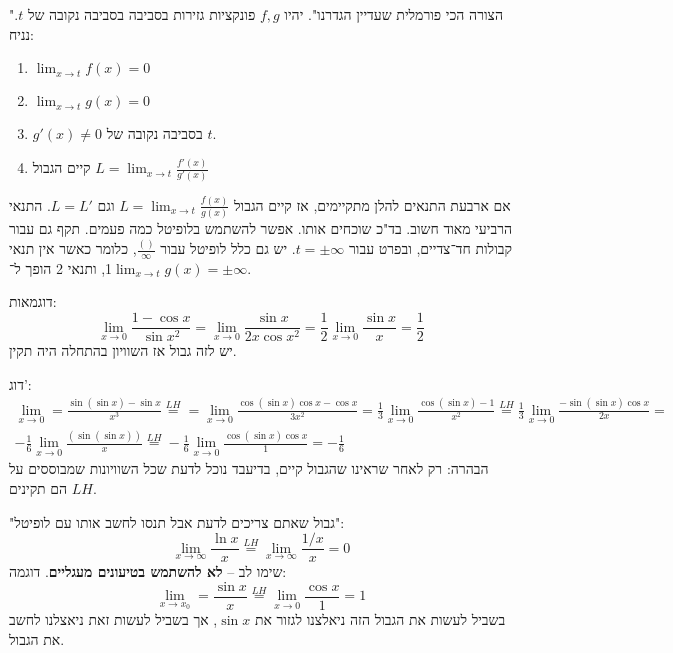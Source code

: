 \documentclass[]{article}
\newcommand\cosx  {\cos x}
\newcommand\sinx  {\sin x}
\newcommand\slh   {\overset{LH}{=}}
\newcommand\limz  {\lim_{x \to 0}}
\newcommand\limxz {\lim_{x \to x_0}}
\newcommand\limi  {\lim_{x \to \infty}}
\renewcommand\inf {\infty}
\begin{document}
	 "הצורה הכי פורמלית שעדיין הגדרנו". יהיו $f, g$ פונקציות גזירות בסביבה בסביבה נקובה של $t$. נניח: 
	 \begin{enumerate}
	 	\item $\lim_{x \to t} f(x) = 0$ 
	 	\item $\lim_{x \to t} g(x) = 0$
	 	\item $g'(x) \neq 0$ בסביבה נקובה של $t$. 
	 	\item קיים הגבול $L = \lim_{x \to t} \frac{f'(x)}{g'(x)}$
	 \end{enumerate}
	 אם ארבעת התנאים להלן מתקיימים, אז קיים הגבול $L = \lim_{x \to t} \frac{f(x)}{g(x)}$ וגם $L = L'$. התנאי הרביעי מאוד חשוב. בד"כ שוכחים אותו. אפשר להשתמש בלופיטל כמה פעמים. תקף גם עבור קבולות חד־צדיים, ובפרט עבור $t = \pm \inf$. יש גם כלל לופיטל עבור $\frac{()}{\inf}$, כלומר כאשר אין תנאי 1, ותנאי 2 הופך ל־$\lim_{x \to t} g(x) = \pm \inf$. 
	 
	 דוגמאות: 
	 \[ \lim_{x \to 0} \frac{1 - \cosx}{\sinx^2} = \limz \frac{\sinx}{2x\cosx^2} = \frac{1}{2}\limz \frac{\sinx}{x} = \frac{1}{2} \]
	 יש לזה גבול אז השוויון בהתחלה היה תקין. 
	 
	 דוג': 
	 \begin{gather*}
	 	\limz = \frac{\sin(\sinx) - \sinx}{x^3} \overset{LH}{=} = \limz \frac{\cos(\sinx)\cosx - \cosx}{3x^2} = \frac{1}{3}\limz \frac{\cos(\sinx) -1 }{x^2} \slh \frac{1}{3}\limz \frac{-\sin(\sinx)\cosx}{2x} = \\ -\frac{1}{6}\limz \frac{(\sin(\sinx))}{x} \slh -\frac{1}{6} \limz\frac{\cos(\sinx)\cosx}{1} = -\frac{1}{6}
	 \end{gather*}
	 הבהרה: רק לאחר שראינו שהגבול קיים, בדיעבד נוכל לדעת שכל השוויונות שמבוססים על $LH$ הם תקינים. 
	 
	 "גבול שאתם צריכים לדעת אבל תנסו לחשב אותו עם לופיטל": 
	 \[ \limi \frac{\ln x}{x} \slh \limi \frac{1/x}{x} = 0 \]
	 שימו לב – \textbf{לא להשתמש בטיעונים מעגליים}. דוגמה: 
	 \[ \limxz = \frac{\sinx}{x} \slh \limz \frac{\cosx}{1} = 1 \]
	 בשביל לעשות את הגבול הזה ניאלצנו לגזור את $\sinx$, אך בשביל לעשות זאת ניאצלנו לחשב את הגבול. 
	 
	 
	 
	
\end{document}
